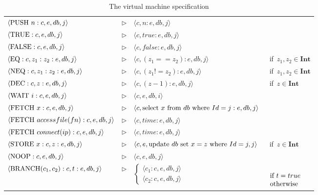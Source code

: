 \documentclass[preprint, prX]{revtex4}
\begin{document}
\begin{table*}[htb]       \caption{The virtual machine specification}
\label{tab:am}
\begin{center}
\vspace{-5mm}
\scriptsize
\begin{tabular}{ | l  l  l  l | }
\hline
  $\langle \textnormal{PUSH}\ n:c,e,db,j \rangle$ & $\triangleright$ & $\langle c,n:e,db,j \rangle$ & \\
  $\langle \textnormal{TRUE}:c,e,db,j \rangle$ & $\triangleright$ & $\langle c,true:e,db,j \rangle$ & \\
  $\langle \textnormal{FALSE}:c,e,db,j \rangle$ & $\triangleright$ & $\langle c,false:e,db,j \rangle$ & \\
  $\langle \textnormal{EQ}:c,z_{1}:z_{2}:e,db,j \rangle$ & $\triangleright$ & $\langle c,(z_{1}==z_{2}):e,db,j \rangle$ & \textnormal{\ if}\ $z_{1},z_{2} \in \textbf{Int}$ \\
  $\langle \textnormal{NEQ}:c,z_{1}:z_{2}:e,db,j \rangle$ & $\triangleright$ & $\langle c,(z_{1}!=z_{2}):e,db,j \rangle$ & \textnormal{\ if}\ $z_{1},z_{2} \in \textbf{Int}$ \\
  $\langle \textnormal{DEC}:c,z:e,db,j \rangle$ & $\triangleright$ & $\langle c,(z-1):e,db,j \rangle$ & \textnormal{\ if}\ $z \in \textbf{Int}$ \\
  $\langle \textnormal{WAIT}\ i:c,e,db,j \rangle$ & $\triangleright$ & $\langle c,e,db,i \rangle$ & \\
  $\langle \textnormal{FETCH}\ x:c,e,db,j \rangle$ & $\triangleright$ & $\langle c,\textnormal{select}\ x\ \textnormal{from}\ db\ \textnormal{where}\ Id=j:e,db,j \rangle$ & \\
  $\langle \textnormal{FETCH}\ accessfile(fn):c,e,db,j \rangle$ & $\triangleright$ & $\langle c,time:e,db,j \rangle$ & \\
  $\langle \textnormal{FETCH}\ connect(ip):c,e,db,j \rangle$ & $\triangleright$ & $\langle c,time:e,db,j \rangle$ & \\
  $\langle \textnormal{STORE}\ x:c,z:e,db,j \rangle$ & $\triangleright$ & $\langle c,e,\textnormal{update}\ db\ \textnormal{set}\ x=z\ \textnormal{where}\ Id=j,j \rangle$ & \textnormal{\ if}\ $z \in
  \textbf{Int}$ \\
  $\langle \textnormal{NOOP}:c,e,db,j \rangle$ & $\triangleright$ & $\langle c,e,db,j \rangle$ & \\
  $\langle \textnormal{BRANCH}(c_{1},c_{2}):c,t:e,db,j \rangle$ & $\triangleright$ &  $\left\{\begin{matrix}
  \langle c_{1}:c,e,db,j \rangle \\
  \langle c_{2}:c,e,db,j \rangle
  \end{matrix}\right.$ & $\begin{array}{l l} \\
  \textnormal{if}\ t=true \\
  \textnormal{otherwise} \\
  \end{array}$ \\
\hline
\end{tabular}
\normalsize
\vspace{-5mm}
\end{center}
\end{table*}
\end{document}
